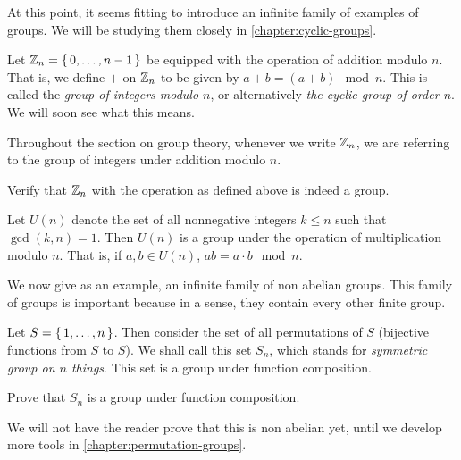 \documentclass[./algebra-notes.tex]{subfiles}
\begin{document}
At this point, it seems fitting to introduce an infinite family of examples of
groups. We will be studying them closely in \cref{chapter:cyclic-groups}. 
\begin{example}
    Let $\mathbb{Z}_n = \set{0, \dots, n-1}$ be equipped with the operation of addition
    modulo $n$. That is, we define $+$ on $\mathbb{Z}_n$ to be given by $a + b = (a +
    b) \mod n$. This is called the \emph{group of integers modulo $n$}, or
    alternatively \emph{the cyclic group of order $n$}. We will soon see what
    this means.
\end{example}
Throughout the section on group theory, whenever we write $\mathbb{Z}_n$, we are
referring to the group of integers under addition modulo $n$. 

\begin{exercise}
    Verify that $\mathbb{Z}_n$ with the operation as defined above is indeed a group.
\end{exercise}

\begin{example}
    Let $U(n)$ denote the set of all nonnegative integers $k \leq n$ such that
    $\gcd(k, n) = 1$. Then $U(n)$ is a group under the operation of
    multiplication modulo $n$. That is, if $a, b \in U(n)$, $ab = a \cdot b \mod
    n$.
\end{example}

We now give as an example, an infinite family of non abelian groups. This family
of groups is important because in a sense, they contain every other finite
group. 
\begin{example}
\label{example:symmetric-groups}
    Let $S = \set{1, \dots, n}$. Then consider the set of all permutations of
    $S$ (bijective functions from $S$ to $S$). We shall call this set $S_n$,
    which stands for \emph{symmetric group on $n$ things}. This set is a group
    under function composition.
\end{example}
\begin{exercise}
    Prove that $S_n$ is a group under function composition.
\end{exercise}
We will not have the reader prove that this is non abelian yet, until we develop
more tools in \cref{chapter:permutation-groups}.
\end{document}
